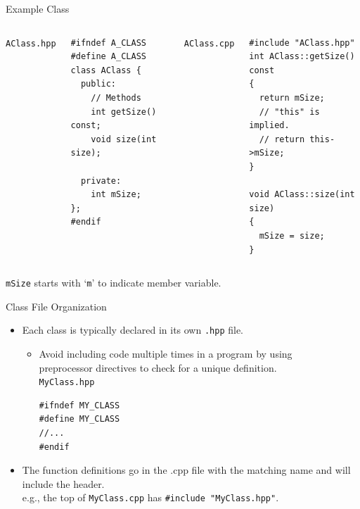 \documentclass[14pt, aspectratio=1610, hyperref={pdfpagelayout=SinglePage}]{beamer}
\begin{document}
\begin{frame}[fragile]{Example Class}
\begin{columns}[t]
\texttt{AClass.hpp}
\begin{lstlisting}[basicstyle=\small\ttfamily, xleftmargin=0pt, aboveskip=0.4ex]
#ifndef A_CLASS
#define A_CLASS
class AClass {
  public:
    // Methods
    int getSize() const;
    void size(int size);

  private:
    int mSize;
};
#endif
\end{lstlisting}
\texttt{AClass.cpp}
\begin{lstlisting}[basicstyle=\small\ttfamily, xleftmargin=0pt, aboveskip=0.4ex]
#include "AClass.hpp"
int AClass::getSize() const
{
  return mSize;
  // "this" is implied.
  // return this->mSize;
}

void AClass::size(int size)
{
  mSize = size;
}
\end{lstlisting}
\end{columns}

\lstinline{mSize} starts with `\texttt{m}' to indicate member variable.
\end{frame}

\begin{frame}[fragile]{Class File Organization}
  \begin{itemize}
  \item
    Each class is typically declared in its own \texttt{.hpp} file.
    \begin{itemize}
    \item
      Avoid including code multiple times in a program by using\\ preprocessor directives to check for a unique definition.\\[0.5em]
      \texttt{MyClass.hpp}
      \begin{lstlisting}[basicstyle=\small\ttfamily, xleftmargin=0pt]
#ifndef MY_CLASS
#define MY_CLASS
//...
#endif\end{lstlisting}
    \end{itemize}
  \item
    The function definitions go in the .cpp file with the matching name and will include the header.\\
      e.g., the top of \texttt{MyClass.cpp} has \lstinline{#include "MyClass.hpp"}.
  \end{itemize}
  \end{frame}
\end{document}
